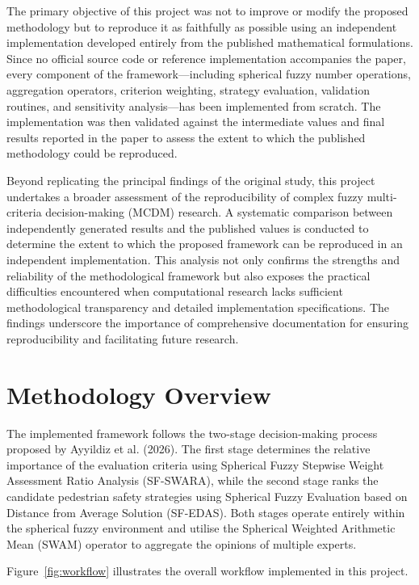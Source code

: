 \documentclass[11pt]{article}
\begin{document}
The primary objective of this project was not to improve or modify the proposed methodology but to reproduce it as faithfully as possible using an independent implementation developed entirely from the published mathematical formulations. Since no official source code or reference implementation accompanies the paper, every component of the framework---including spherical fuzzy number operations, aggregation operators, criterion weighting, strategy evaluation, validation routines, and sensitivity analysis---has been implemented from scratch. The implementation was then validated against the intermediate values and final results reported in the paper to assess the extent to which the published methodology could be reproduced.

Beyond replicating the principal findings of the original study, this project undertakes a broader assessment of the reproducibility of complex fuzzy multi-criteria decision-making (MCDM) research. A systematic comparison between independently generated results and the published values is conducted to determine the extent to which the proposed framework can be reproduced in an independent implementation. This analysis not only confirms the strengths and reliability of the methodological framework but also exposes the practical difficulties encountered when computational research lacks sufficient methodological transparency and detailed implementation specifications. The findings underscore the importance of comprehensive documentation for ensuring reproducibility and facilitating future research.

\section{Methodology Overview}
The implemented framework follows the two-stage decision-making process proposed by Ayyildiz et al. (2026). The first stage determines the relative importance of the evaluation criteria using Spherical Fuzzy Stepwise Weight Assessment Ratio Analysis (SF-SWARA), while the second stage ranks the candidate pedestrian safety strategies using Spherical Fuzzy Evaluation based on Distance from Average Solution (SF-EDAS). Both stages operate entirely within the spherical fuzzy environment and utilise the Spherical Weighted Arithmetic Mean (SWAM) operator to aggregate the opinions of multiple experts.

Figure~\ref{fig:workflow} illustrates the overall workflow implemented in this project.
\end{document}
